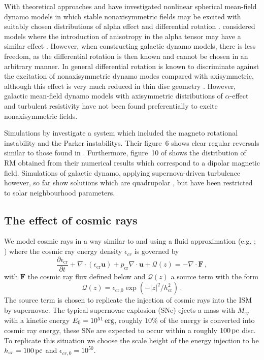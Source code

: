 \documentclass[fleqn,usenatbib]{mnras}
\newcommand\deriv[2]{\frac{\partial#1}{\partial#2}}%
\renewcommand\vec[1]{\bm{#1}}%
\newcommand{\p}{\,{\rm pc}}     %
\newcommand{\erg}{\,{\rm erg}}  %
\begin{document}
 {With theoretical approaches} \citet{RWBM1990} and \citet{MTB1991} have
investigated nonlinear spherical mean-field dynamo models in which stable
nonaxisymmetric fields may be excited with suitably chosen distributions of
alpha effect and differential rotation \citep[see also][]{S1971}.
\citet{RE1992} considered models where the introduction of anisotropy in the
alpha tensor may have a similar effect \citep[see also][]{R1980}. However, when
constructing galactic dynamo models, there is less freedom, as the differential
rotation is then known and cannot be chosen in an arbitrary manner. In general
differential rotation is known to discriminate against the excitation of
nonaxisymmetric  dynamo modes compared with axisymmetric, although this effect
is very much reduced in thin disc geometry \citep{MB1992}. However, galactic
mean-field dynamo models with axisymmetric distributions of $\alpha$-effect and
turbulent resistivity have not been found preferentially to excite
nonaxisymmetric fields.

Simulations by \citet{MNKASM2013} investigate a system which included the
magneto rotational instability and the Parker instabilitys. Their figure~6
shows clear regular reversals similar to those found in \citet{QSTGB23}.
Furthermore, figure~10 of \citet{MNKASM2013} shows the distribution of RM
obtained from their numerical results which correspond to a dipolar magnetic
field. {Simulations of galactic dynamo, applying supernova-driven turbulence
however, so far show solutions which are quadrupolar
\citep{Gressel2008,OGPhD,Gent2013,GMK23}, but have been restricted to solar
neighbourhood parameters.}

\subsection{The effect of cosmic rays}\label{sec:CM}

We model cosmic rays in a way similar to \citet{DT2022b} and
\citet{Luiz_R_2015a} using a fluid approximation (e.g. \citet{Parker1969};
\citet{SRLI1985}) where the cosmic ray energy density $\epsilon_{cr}$ is
governed by
\begin{equation}
    \deriv{\epsilon_\text{cr}}{t} + \nabla\cdot(\epsilon_\text{cr}\vec{u}) + p_\text{cr}\nabla\cdot\vec{u} + \mathcal{Q}(z) =  -\nabla \cdot\vec{F}\,,
\end{equation}
with $\vec{F}$ the cosmic ray flux defined below and $\mathcal{Q}(z)$ a source term with the form
\begin{equation}
    \mathcal{Q}(z) = \epsilon_\text{cr,0}\exp(-|z|^2/h_\text{cr}^2)\,.
\end{equation}
The source term is chosen to replicate the injection of cosmic rays into the
ISM by supernovae. The typical supernovae explosion (SNe) ejects a mass with
$M_{ej}$ with a kinetic energy $E_0 = 10^{51}\erg$, roughly $10\%$ of the
energy is converted into cosmic ray energy, these SNe are expected to occur
within a roughly $100\p$ disc. To replicate this situation we choose the scale
height of the energy injection to be $h_{cr}=100\p$ and $\epsilon_{cr,0} =
10^{50}$.
\end{document}
